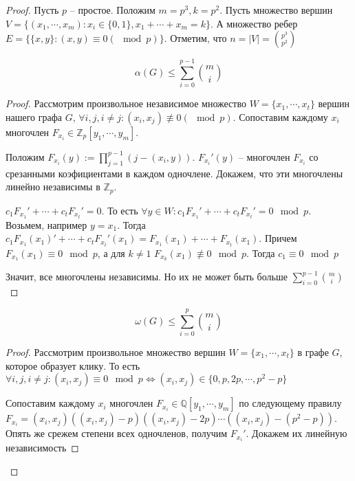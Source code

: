 \documentclass[document.tex]{subfiles}
\begin{document}
\begin{proof}
    Пусть $p$ -- простое. Положим $m = p^3, k = p^2$. Пусть множество вершин $V = \{(x_1, \cdots, x_m) : x_i \in \{0,
    1\}, x_1 + \cdots + x_m = k \}$. А множество ребер $E = \{ \{x, y\}: (x, y) \equiv 0 (\mod p)\}$. Отметим, что $n =
    |V| = \binom{p^3}{p^2}$

    \begin{lemma}
        \[
            \alpha(G) \leq \sum_{i = 0}^{p - 1} \binom{m}{i}
        \]
    \end{lemma}
    \begin{proof}
        Рассмотрим произвольное независимое множество $W = \{x_1, \cdots, x_t\}$ вершин нашего графа $G$, $\forall i, j,
        i \neq j : (x_i, x_j) \not \equiv 0 (\mod p)$. Сопоставим каждому $x_i$ многочлен $F_{x_{i}} \in
        \mathbb{Z}_p[y_1, \cdots, y_m]$.

        Положим $F_{x_i}(y) := \prod_{j = 1}^{p - 1} (j - (x_i, y))$. $F_{x_i}'(y)$ -- многочлен $F_{x_i}$ со срезанными
        коэфициентами в каждом одночлене. Докажем, что эти многочлены линейно независимы в $\mathbb{Z}_p$.

        $ c_1 F_{x_1}' + \cdots + c_t F_{x_t}' = 0$. То есть $\forall y \in W: c_1 F_{x_1}' + \cdots + c_t F_{x_t}' = 0
        \mod p$. Возьмем, например $y = x_1$. Тогда $c_1 F_{x_1}(x_1)' + \cdots + c_t F_{x_t}'(x_1) = F_{x_1}(x_1) +
        \cdots + F_{x_t}(x_1)$. Причем $F_{x_1}(x_1) \equiv 0 \mod p$, а для $k \neq 1$ $F_{x_k}(x_1) \not \equiv 0 \mod
        p$. Тогда $c_1 \equiv 0 \mod p$

        Значит, все многочлены независимы. Но их не может быть больше $\sum_{i = 0}^{p - 1} \binom{m}{i}$
    \end{proof}
    \begin{lemma}
        \[
            \omega(G) \leq \sum_{i = 0}^{p} \binom{m}{i}
        \]
    \end{lemma}
    \begin{proof}
        Рассмотрим произвольное множество вершин $W = \{x_1, \cdots, x_t\}$ в графе $G$, которое образует клику. То есть
        $\forall i, j, i \neq j: (x_i, x_j) \equiv 0 \mod p \Leftrightarrow (x_i, x_j) \in \{0, p, 2p, \cdots, p^2 - p\}$

        Сопоставим каждому $x_i$ многочлен $F_{x_i} \in \mathbb{Q}[y_1, \cdots, y_m]$ по следующему правилу
        $F_{x_i} = (x_i, x_j)( (x_i, x_j) - p) ( (x_i, x_j) - 2p) \cdots ( (x_i, x_j) - (p^2 - p) )$. Опять же срежем
        степени всех одночленов, получим $F_{x_i}'$. Докажем их линейную независимость


\end{proof}
\end{proof}
\end{document}
